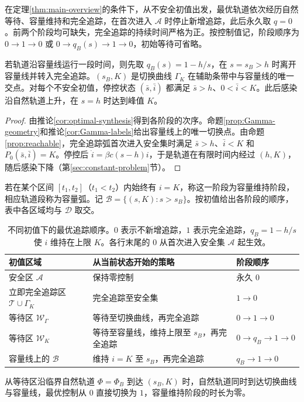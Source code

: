 \documentclass[lang=cn,a4paper,newtx]{elegantpaper}
\theoremstyle{plain}
\theoremstyle{definition}
\newcommand{\Acal}{\mathcal A}
\newcommand{\Dcal}{\mathcal D}
\begin{document}
\begin{proposition}[最优追踪阶段与停控状态]
\label{prop:main-structure}
在定理\ref{thm:main-overview}的条件下，从不安全初值出发，最优轨道依次经历自然等待、容量维持和完全追踪，在首次进入 $\Acal$ 时停止新增追踪，此后永久取 $q=0$。前两个阶段均可缺失，完全追踪的持续时间严格为正。按控制值记，阶段顺序为 $0\to1\to0$ 或 $0\to q_B(s)\to1\to0$，初始等待可省略。

若轨道沿容量线运行一段时间，则先取 $q_B(s)=1-h/s$，在 $s=s_B>h$ 时离开容量线并转入完全追踪。$(s_B,K)$ 是切换曲线 $\Gamma_K$ 在辅助条带中与容量线的唯一交点。对每个不安全初值，停控状态 $(\bar s,\bar i)$ 都满足 $\bar s>h$、$0<\bar i<K$。此后感染沿自然轨道上升，在 $s=h$ 时达到峰值 $K$。
\end{proposition}
\begin{proof}
由推论\ref{cor:optimal-synthesis}得到各阶段的次序。命题\ref{prop:Gamma-geometry}和推论\ref{cor:Gamma-labels}给出容量线上的唯一切换点。由命题\ref{prop:reachable}，完全追踪弧首次进入安全集时满足 $\bar s>h$、$\bar i<K$ 和 $P_0(\bar s,\bar i)=K$。停控后 $\dot i=\beta c(s-h)i$，于是轨道在有限时间内经过 $(h,K)$，随后感染下降（第\ref{sec:constant-problem}节）。
\end{proof}

若在某个区间 $[t_1,t_2]$（$t_1<t_2$）内始终有 $i=K$，称这一阶段为容量维持阶段，相应轨道段称为容量弧。记 $\mathcal B=\{(s,K):s>s_B\}$。按初值给出各阶段的顺序，表中各区域均与 $\Dcal$ 取交。
\begin{table}[H]
\centering\small
\caption{不同初值下的最优追踪顺序。$0$ 表示不新增追踪，$1$ 表示完全追踪，$q_B=1-h/s$ 使 $i$ 维持在上限 $K$。各行末尾的 $0$ 从首次进入安全集 $\Acal$ 起生效。}
\label{tab:optimal-stages}
\begin{tabularx}{\linewidth}{@{}>{\raggedright\arraybackslash}p{4.1cm}>{\raggedright\arraybackslash}Xl@{}}
\toprule
初值区域 & 从当前状态开始的策略 & 阶段顺序\\
\midrule
安全区 $\Acal$ & 保持零控制 & 永久 $0$\\
立即完全追踪区 $\mathcal T\cup\Gamma_K$ & 完全追踪至安全集 & $1\to0$\\
等待区 $\mathcal W_\Gamma$ & 等待至切换曲线，再完全追踪 & $0\to1\to0$\\
等待区 $\mathcal W_K$ & 等待至容量线，维持上限至 $s_B$，再完全追踪 & $0\to q_B\to1\to0$\\
容量线上的 $\mathcal B$ & 维持 $i=K$ 至 $s_B$，再完全追踪 & $q_B\to1\to0$\\
\bottomrule
\end{tabularx}
\end{table}
从等待区沿临界自然轨道 $\Phi=\Phi_B$ 到达 $(s_B,K)$ 时，自然轨道同时到达切换曲线与容量线，最优控制从 $0$ 直接切换为 $1$，容量维持阶段的时长为零。
\end{document}
